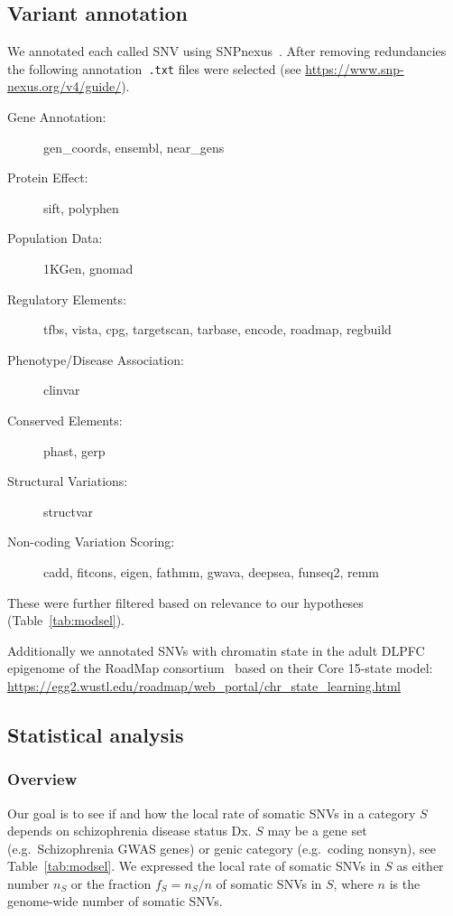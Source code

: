 \documentclass[letterpaper]{article}
\begin{document}
\subsection*{Variant annotation}

We annotated each called SNV using SNPnexus~\citep{Oscanoa2020}.  After
removing redundancies the following annotation~\texttt{.txt} files were
selected (see \url{https://www.snp-nexus.org/v4/guide/}).

\begin{description}
\item[Gene Annotation:] gen\_coords, ensembl, near\_gens
\item[Protein Effect:] sift, polyphen
\item[Population Data:] 1KGen, gnomad
\item[Regulatory Elements:] tfbs, vista, cpg, targetscan, tarbase, encode, roadmap, regbuild
\item[Phenotype/Disease Association:] clinvar
\item[Conserved Elements:] phast, gerp
\item[Structural Variations:] structvar
\item[Non-coding Variation Scoring:] cadd, fitcons, eigen, fathmm, gwava, deepsea, funseq2, remm
\end{description}

These were further filtered based on relevance to our
hypotheses (Table~\ref{tab:modsel}).

Additionally we annotated SNVs with chromatin state in the adult DLPFC
epigenome of the RoadMap consortium~\citep{Kundaje2015} based on their
Core 15-state model:\\
\url{https://egg2.wustl.edu/roadmap/web\_portal/chr\_state\_learning.html}

\subsection*{Statistical analysis}

\subsubsection*{Overview}

Our goal is to see if and how the local rate of somatic SNVs in a category $S$
depends on schizophrenia disease status Dx.  $S$ may be a gene set
(e.g.~Schizophrenia GWAS genes) or genic category (e.g.~coding nonsyn), see
Table~\ref{tab:modsel}.  We expressed the local rate of somatic SNVs in $S$ as
either number $n_S$ or the fraction $f_S = n_S / n$ of somatic SNVs in $S$,
where $n$ is the genome-wide number of somatic SNVs.
\end{document}
